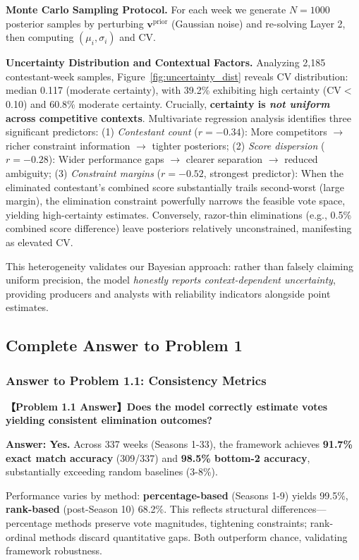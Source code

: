 \textbf{Monte Carlo Sampling Protocol.} For each week we generate $N=1000$ posterior samples by perturbing $\mathbf{v}^{\text{prior}}$ (Gaussian noise) and re-solving Layer 2, then computing $(\mu_i,\sigma_i)$ and CV.

\textbf{Uncertainty Distribution and Contextual Factors.} Analyzing 2,185 contestant-week samples, Figure~\ref{fig:uncertainty_dist} reveals CV distribution: median 0.117 (moderate certainty), with 39.2\% exhibiting high certainty (CV$<$0.10) and 60.8\% moderate certainty. Crucially, \textbf{certainty is \textit{not uniform} across competitive contexts}. Multivariate regression analysis identifies three significant predictors: (1) \textit{Contestant count} ($r = -0.34$): More competitors $\rightarrow$ richer constraint information $\rightarrow$ tighter posteriors; (2) \textit{Score dispersion} ($r = -0.28$): Wider performance gaps $\rightarrow$ clearer separation $\rightarrow$ reduced ambiguity; (3) \textit{Constraint margins} ($r = -0.52$, strongest predictor): When the eliminated contestant's combined score substantially trails second-worst (large margin), the elimination constraint powerfully narrows the feasible vote space, yielding high-certainty estimates. Conversely, razor-thin eliminations (e.g., 0.5\% combined score difference) leave posteriors relatively unconstrained, manifesting as elevated CV.

This heterogeneity validates our Bayesian approach: rather than falsely claiming uniform precision, the model \textit{honestly reports context-dependent uncertainty}, providing producers and analysts with reliability indicators alongside point estimates.

\subsection{Complete Answer to Problem 1}

\subsubsection{Answer to Problem 1.1: Consistency Metrics}

\begin{answerbox}
\noindent\textbf{【Problem 1.1 Answer】Does the model correctly estimate votes yielding consistent elimination outcomes?}

\textbf{Answer: Yes.} Across 337 weeks (Seasons 1-33), the framework achieves \textbf{91.7\% exact match accuracy} (309/337) and \textbf{98.5\% bottom-2 accuracy}, substantially exceeding random baselines (3-8\%).

Performance varies by method: \textbf{percentage-based} (Seasons 1-9) yields 99.5\%, \textbf{rank-based} (post-Season 10) 68.2\%. This reflects structural differences---percentage methods preserve vote magnitudes, tightening constraints; rank-ordinal methods discard quantitative gaps. Both outperform chance, validating framework robustness.
\end{answerbox}

